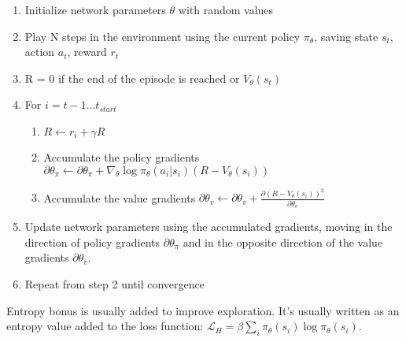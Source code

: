 \begin{enumerate}
\item Initialize network parameters \begin{math}\theta\end{math} with random values
\item
  Play N steps in the environment using the current
  policy \begin{math}\pi_\theta\end{math}, saving
    state $s_t$, action $a_t$, reward $r_t$
  \item  R = 0 if the end of the episode is reached or \begin{math}V_\theta(s_t)\end{math}
  \item
    For \begin{math}i = t-1 \ldots t_{start}\end{math}
    
    \begin{enumerate}
\item \begin{math}R \leftarrow r_i + \gamma R\end{math}
\item Accumulate the policy gradients \begin{math} \partial\theta_\pi \leftarrow
  \partial\theta_\pi + \nabla_\theta \log \pi_\theta(a_i|s_i)(R - V_\theta(s_i)) \end{math}
\item Accumulate the value gradients \begin{math}\partial \theta_v \leftarrow
  \partial \theta_v + \frac{\partial (R - V_\theta(s_i))^2}{\partial \theta_v}\end{math}
    \end{enumerate}

\item Update network parameters using the accumulated gradients, moving in the
  direction of policy gradients \begin{math}\partial\theta_\pi\end{math} and in
    the opposite direction of the value gradients \begin{math}\partial \theta_v\end{math}.
\item Repeat from step 2 until convergence

\end{enumerate}


Entropy bonus is usually added to improve exploration. It’s usually written as
an entropy value added to the loss function: \begin{math}\mathcal{L}_H = \beta
  \sum_i \pi_\theta(s_i) \log \pi_\theta(s_i)\end{math}.


